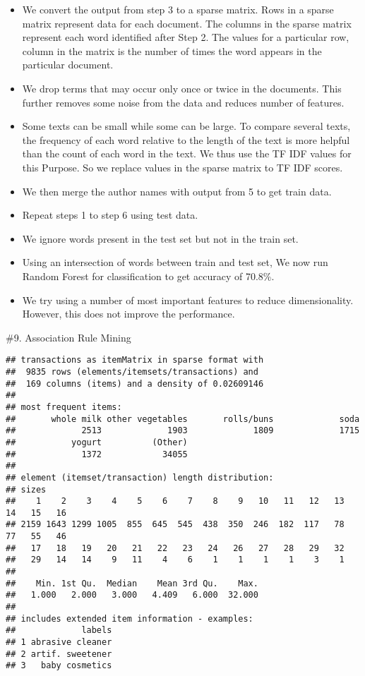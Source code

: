 \documentclass[
  12pt,
]{article}
\begin{document}
\begin{itemize}
\item
  We convert the output from step 3 to a sparse matrix. Rows in a sparse
  matrix represent data for each document. The columns in the sparse
  matrix represent each word identified after Step 2. The values for a
  particular row, column in the matrix is the number of times the word
  appears in the particular document.
\item
  We drop terms that may occur only once or twice in the documents. This
  further removes some noise from the data and reduces number of
  features.
\item
  Some texts can be small while some can be large. To compare several
  texts, the frequency of each word relative to the length of the text
  is more helpful than the count of each word in the text. We thus use
  the TF IDF values for this Purpose. So we replace values in the sparse
  matrix to TF IDF scores.
\item
  We then merge the author names with output from 5 to get train data.
\item
  Repeat steps 1 to step 6 using test data.
\item
  We ignore words present in the test set but not in the train set.
\item
  Using an intersection of words between train and test set, We now run
  Random Forest for classification to get accuracy of 70.8\%.
\item
  We try using a number of most important features to reduce
  dimensionality. However, this does not improve the performance.
\end{itemize}

\nextpage

\#9. Association Rule Mining

\begin{verbatim}
## transactions as itemMatrix in sparse format with
##  9835 rows (elements/itemsets/transactions) and
##  169 columns (items) and a density of 0.02609146 
## 
## most frequent items:
##       whole milk other vegetables       rolls/buns             soda 
##             2513             1903             1809             1715 
##           yogurt          (Other) 
##             1372            34055 
## 
## element (itemset/transaction) length distribution:
## sizes
##    1    2    3    4    5    6    7    8    9   10   11   12   13   14   15   16 
## 2159 1643 1299 1005  855  645  545  438  350  246  182  117   78   77   55   46 
##   17   18   19   20   21   22   23   24   26   27   28   29   32 
##   29   14   14    9   11    4    6    1    1    1    1    3    1 
## 
##    Min. 1st Qu.  Median    Mean 3rd Qu.    Max. 
##   1.000   2.000   3.000   4.409   6.000  32.000 
## 
## includes extended item information - examples:
##             labels
## 1 abrasive cleaner
## 2 artif. sweetener
## 3   baby cosmetics
\end{verbatim}
\end{document}

